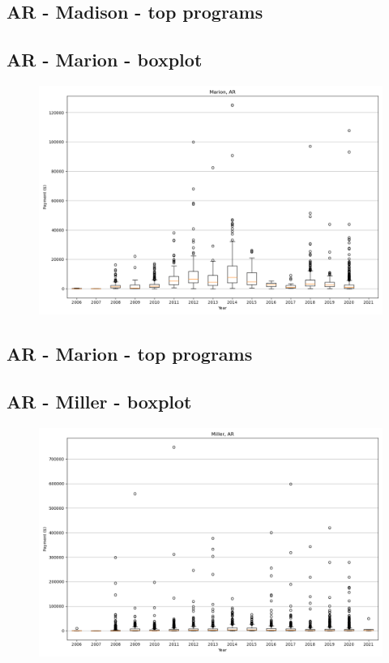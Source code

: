 \subsection*{AR - Madison - top programs}

\newpage
\subsection*{AR - Marion - boxplot}
\begin{figure}[h]
\centering
\includegraphics[width=7in]{../output/boxplots/counties/Marion-AR_boxplot.png}
\end{figure}


\subsection*{AR - Marion - top programs}

\newpage
\subsection*{AR - Miller - boxplot}
\begin{figure}[h]
\centering
\includegraphics[width=7in]{../output/boxplots/counties/Miller-AR_boxplot.png}
\end{figure}


